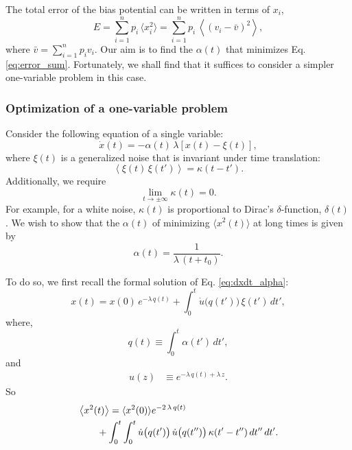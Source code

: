 \documentclass[reprint]{revtex4-1}
\newcommand{\Err}{E}
\begin{document}
The total error of the bias potential can be written in
terms of $x_i$,
\begin{equation}
\Err
=
\sum_{i = 1}^n p_i \, \langle x_i^2 \rangle
=
\sum_{i = 1}^n p_i \, \left\langle (v_i - \bar v)^2 \right\rangle,
\label{eq:error_sum}
\end{equation}
where
$\bar v = \sum_{i = 1}^n p_i v_i$.
%
Our aim is to find the $\alpha(t)$
that minimizes Eq. \eqref{eq:error_sum}.
%
Fortunately, we shall find that it suffices to consider
a simpler one-variable problem
in this case.



\subsubsection{Optimization of a one-variable problem}



Consider the following equation
of a single variable:
%
\begin{equation}
\dot x(t) = -\alpha(t) \, \lambda \left[ x(t) - \xi(t) \right],
\label{eq:dxdt_alpha}
\end{equation}
%
where $\xi(t)$ is a generalized noise
that is invariant under time translation:
%
\begin{equation}
\left\langle \xi(t) \, \xi(t') \right\rangle
=
\kappa(t - t').
\label{eq:noise_correlation}
\end{equation}
%
Additionally, we require
\begin{equation}
  \lim_{t \rightarrow \pm\infty} \kappa(t) = 0.
  \label{eq:kappat_limit}
\end{equation}
%
For example, for a white noise,
$\kappa(t)$ is proportional to
Dirac's $\delta$-function, $\delta(t)$.
%
We wish to show that the $\alpha(t)$
of minimizing $\langle x^2(t) \rangle$ at long times
is given by
%
\begin{equation}
  \alpha(t) = \frac{1}{\lambda \, (t + t_0)}.
\label{eq:alpha_opt}
\end{equation}



To do so, we first recall
the formal solution of Eq. \eqref{eq:dxdt_alpha}:
%
\begin{equation}
x(t) = x(0) \, e^{-\lambda \, q(t)}
+ \int_0^t \dot u\bigl( q(t') \bigr) \, \xi(t') \, dt',
\label{eq:xt_solution}
\end{equation}
%
where,
%
\begin{equation}
q(t) \equiv \int_0^t \alpha(t') \, dt',
\label{eq:qt_definition}
\end{equation}
%
and
%
\begin{align}
u(z)
&\equiv
e^{-\lambda \, q(t) + \lambda \, z}.
\label{eq:ut_definition}
\end{align}
So
\begin{align}
&\left\langle x^2(t) \right\rangle
=
\langle x^2(0) \rangle e^{-2 \, \lambda \, q(t)}
\notag
\\
&\qquad
+
\int_0^t \int_0^t
  \dot u\bigl( q(t') \bigr) \,
  \dot u\bigl( q(t'') \bigr) \,
  \kappa(t' - t'') \, dt'' \, dt'.
\label{eq:x2t_average}
\end{align}
\end{document}
